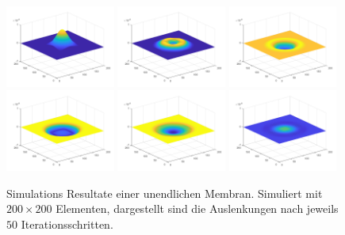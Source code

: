 \begin{figure}
	
	\begin{center}
		
		\includegraphics[width=0.32\textwidth]{papers/kreismembran/images/sim_2_1.png}
		\includegraphics[width=0.32\textwidth]{papers/kreismembran/images/sim_2_2.png}
		\includegraphics[width=0.32\textwidth]{papers/kreismembran/images/sim_2_3.png}
		\includegraphics[width=0.32\textwidth]{papers/kreismembran/images/sim_2_4.png}
		\includegraphics[width=0.32\textwidth]{papers/kreismembran/images/sim_2_5.png}
		\includegraphics[width=0.32\textwidth]{papers/kreismembran/images/sim_2_6.png}
		\caption{Simulations Resultate einer unendlichen Membran. Simuliert mit $ 200 \times 200 $ Elementen, dargestellt sind die Auslenkungen nach jeweils $ 50 $ Iterationsschritten.}
		\label{kreismembran:im:simres_unendlich}
		
	\end{center}	
\end{figure}
